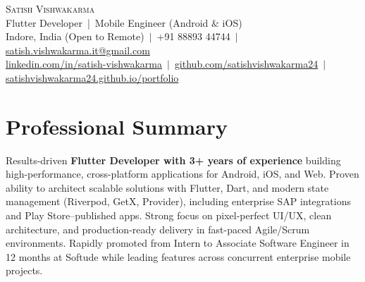 \documentclass[a4paper,10pt]{article}
\begin{document}
\begin{center}
    {\Huge \scshape Satish Vishwakarma} \\[2pt]
    {\small Flutter Developer \,|\, Mobile Engineer (Android \& iOS)} \\[4pt]
    \small
    Indore, India (Open to Remote) \,$|$\,
    +91 88893 44744 \,$|$\,
    \href{mailto:satish.vishwakarma.it@gmail.com}{satish.vishwakarma.it@gmail.com} \\[2pt]
    \href{https://www.linkedin.com/in/satish-vishwakarma}{linkedin.com/in/satish-vishwakarma} \,$|$\,
    \href{https://github.com/satishvishwakarma24}{github.com/satishvishwakarma24} \,$|$\,
    \href{https://satishvishwakarma24.github.io/portfolio/}{satishvishwakarma24.github.io/portfolio}
\end{center}

\section{Professional Summary}
Results-driven \textbf{Flutter Developer with 3+ years of experience} building high-performance, cross-platform applications for Android, iOS, and Web. Proven ability to architect scalable solutions with Flutter, Dart, and modern state management (Riverpod, GetX, Provider), including enterprise SAP integrations and Play Store--published apps. Strong focus on pixel-perfect UI/UX, clean architecture, and production-ready delivery in fast-paced Agile/Scrum environments. Rapidly promoted from Intern to Associate Software Engineer in 12 months at Softude while leading features across concurrent enterprise mobile projects.

\end{document}
